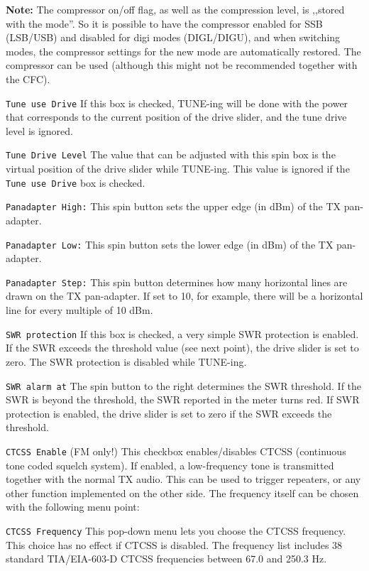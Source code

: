 \documentclass[12pt]{book}
\def\rett#1{\texttt{\color{red}#1}}
\begin{document}
\textbf{Note:} The compressor on/off flag, as well as the compression level, is
,,stored with the mode''. So it is possible to have the compressor enabled for SSB
(LSB/USB)
and disabled for digi modes (DIGL/DIGU), and when switching modes, the compressor
settings for the new mode are automatically restored. The compressor can be used (although
this might not be recommended together with the CFC).

\rett{Tune use Drive} If this box is checked, TUNE-ing will be done with the power that corresponds to the
current position of the drive slider, and the tune drive level is ignored.

\rett{Tune Drive Level} The value that can be adjusted with this spin box is the virtual position of the
drive slider while TUNE-ing. This value is ignored if the \rett{Tune use Drive} box is checked.

\rett{Panadapter High:} This spin button sets the upper edge (in dBm) of the TX pan-adapter.

\rett{Panadapter Low:} This spin button sets the lower edge (in dBm) of the TX pan-adapter.

\rett{Panadapter Step:} This spin button determines how many horizontal lines are drawn on the
TX pan-adapter. If set to 10, for example, there will be a horizontal line for every multiple
of 10 dBm.

\rett{SWR protection} If this box is checked, a very simple SWR protection is enabled. If the SWR exceeds
the threshold value (see next point), the drive slider is set to zero. The SWR protection is disabled
while TUNE-ing.

\rett{SWR alarm at} The spin button to the right determines the SWR threshold. If the SWR is beyond the
threshold, the SWR reported in the meter turns red. If SWR protection is enabled, the drive slider is set to
zero if the SWR exceeds the threshold.

\rett{CTCSS Enable} (FM only!) This checkbox enables/disables CTCSS (continuous tone coded squelch system).
If enabled, a low-frequency
tone is transmitted together with the normal TX audio. This can be used to trigger repeaters, or any other
function implemented
on the other side. The frequency itself can be chosen with the following menu point:

\rett{CTCSS Frequency} This pop-down menu lets you choose the CTCSS frequency. This choice has no effect if
CTCSS is disabled.
The frequency list includes 38 standard TIA/EIA-603-D CTCSS frequencies between 67.0 and 250.3 Hz.
\end{document}
